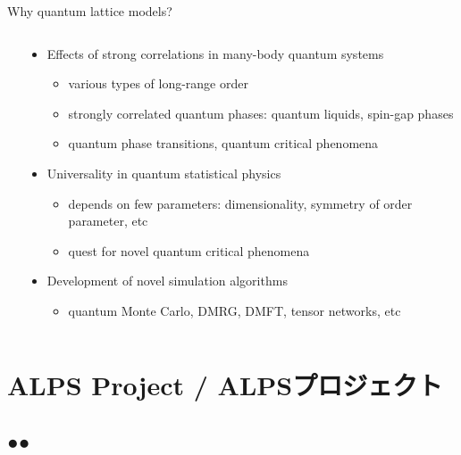 \begin{frame}{Why quantum lattice models?}
\begin{columns}[T]
\begin{column}{.2\textwidth}
    \end{column}
    \begin{column}{.8\textwidth}
      \begin{itemize}
      \item Effects of strong correlations in many-body quantum systems
        \begin{itemize}
        \item various types of long-range order
        \item strongly correlated quantum phases: quantum liquids, spin-gap phases
        \item quantum phase transitions, quantum critical phenomena
        \end{itemize}
      \item Universality in quantum statistical physics
        \begin{itemize}
        \item depends on few parameters: dimensionality, symmetry of order parameter, etc
        \item quest for novel quantum critical phenomena
        \end{itemize}
      \item Development of novel simulation algorithms
        \begin{itemize}
        \item quantum Monte Carlo, DMRG, DMFT, tensor networks, etc
        \end{itemize}
      \end{itemize}
    \end{column}
  \end{columns}
\end{frame}

\section{ALPS Project / ALPSプロジェクト}
\subsection*{{\protect\color{red}●}{\protect\color{blue}●}}

